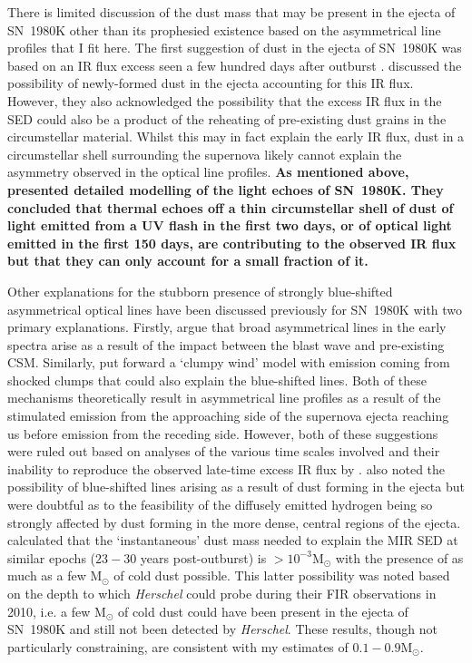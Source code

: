 There is limited discussion of the dust mass that may be present in the ejecta of SN~1980K other than its prophesied existence based on the asymmetrical line profiles that I fit here.  The first suggestion of dust in the ejecta of SN~1980K was based on an IR flux excess seen a few hundred days after outburst \citep{Dwek1983}.  \citet{Dwek1983} discussed the possibility of newly-formed dust in the ejecta accounting for this IR flux. However, they also acknowledged the possibility that the excess IR flux in the SED could also be a product of the reheating of pre-existing dust grains in the circumstellar material.  Whilst this may in fact explain the early IR flux,  dust in a circumstellar shell surrounding the supernova likely cannot explain the asymmetry observed in the optical line profiles. {\bf As mentioned above, \citet{Sugerman2012} presented detailed modelling of the light echoes of SN~1980K.  They concluded that thermal echoes off a thin circumstellar shell of dust of light emitted from a UV flash in the first two days, or of optical light emitted in the first 150 days, are contributing to the observed IR flux but that they can only account for a small fraction of it.}

Other explanations for the stubborn presence of strongly blue-shifted asymmetrical optical lines have been discussed previously for SN~1980K  with two primary explanations.  Firstly, \citet{Fesen1990} argue that broad asymmetrical lines in the early spectra arise as a result of the impact between the blast wave and pre-existing CSM.  Similarly, \citet{Chugai1994} put forward a `clumpy wind' model with emission coming from shocked clumps that could also explain the blue-shifted lines.  Both of these mechanisms theoretically result in asymmetrical line profiles as a result of the stimulated emission from the approaching side of the supernova ejecta reaching us before emission from the receding side.  However, both of these suggestions were ruled out based on analyses of the various time scales involved and their inability to reproduce the observed late-time excess IR flux by \citet{Sugerman2012}.  \citet{Fesen1990}  also noted the possibility of blue-shifted lines  arising as a result of dust forming in the ejecta but were doubtful as to the feasibility of the diffusely emitted hydrogen being so strongly affected by dust forming in the more dense, central regions of the ejecta.  \citet{Sugerman2012} calculated that the `instantaneous' dust mass needed to explain the MIR SED at similar epochs ($23-30$ years post-outburst) is $>10^{-3}$M$_{\odot}$ with the presence of as much as a few M$_{\odot}$ of cold dust possible.  This latter possibility was noted based on the depth to which {\em Herschel} could probe during their FIR observations in 2010, i.e. a few M$_{\odot}$ of cold dust could have been present in the ejecta of SN~1980K and still not been detected by {\em Herschel}.  These results, though not particularly constraining, are consistent with my estimates of $0.1-0.9$M$_{\odot}$.

